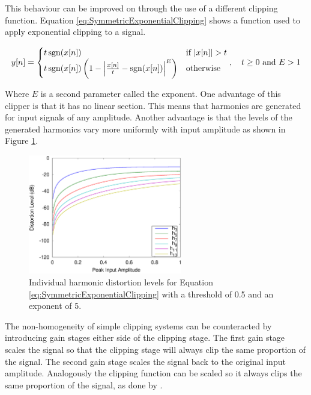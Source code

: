 			This behaviour can be improved on through the use of a different clipping function. Equation
			\ref{eq:SymmetricExponentialClipping} shows a function used to apply exponential clipping to a
			signal.
			
			\begin{equation}
				y[n] = \begin{cases}
					t\operatorname{sgn}(x[n]) & \text{if $\left|x[n]\right| > t$} \\
					t\operatorname{sgn}(x[n]) \left(1 - \left|\frac{x[n]}{t} - \operatorname{sgn}(x[n])\right|^{E} \right) &
						\text{otherwise}
				\end{cases}, \quad t \geq 0 \ \text{and} \ E > 1
				\label{eq:SymmetricExponentialClipping}
			\end{equation}

			Where $E$ is a second parameter called the exponent. One advantage of this clipper is that it has
			no linear section. This means that harmonics are generated for input signals of any amplitude.
			Another advantage is that the levels of the generated harmonics vary more uniformly with input
			amplitude as shown in Figure \ref{fig:ExponentialClippingHarmonics}.

			\begin{figure}[h!]
				\centering
				\includegraphics[width=0.6\textwidth]{chapter5/Images/ExponentialClippingHarmonics.eps}
				\caption{Individual harmonic distortion levels for Equation
					 \ref{eq:SymmetricExponentialClipping} with a threshold of 0.5 and an 
				         exponent of 5.}
				\label{fig:ExponentialClippingHarmonics}
			\end{figure}

			The non-homogeneity of simple clipping systems can be counteracted by introducing gain stages
			either side of the clipping stage. The first gain stage scales the signal so that the clipping
			stage will always clip the same proportion of the signal. The second gain stage scales the signal
			back to the original input amplitude. Analogously the clipping function can be scaled so it
			always clips the same proportion of the signal, as done by \citet{deman2014adaptive}.


